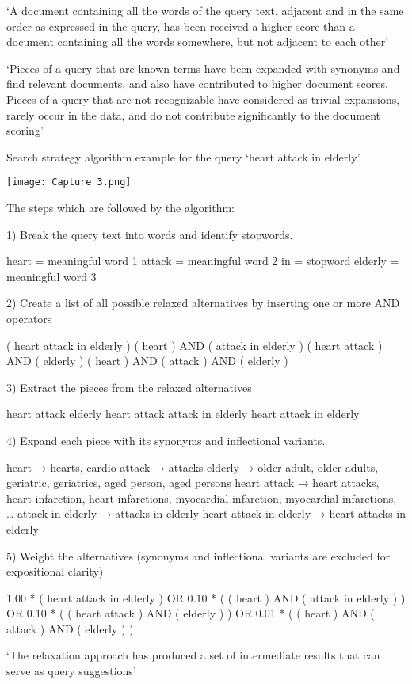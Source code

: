 \documentclass[]{article}
\begin{document}
{{‘A document containing all the words of the query text, adjacent and in the same order as expressed in the query, has been received a higher score than a document containing all the words somewhere, but not adjacent to each other’

‘Pieces of a query that are known terms have been expanded with synonyms and find relevant documents, and also have contributed to higher document scores. Pieces of a query that are not recognizable have considered as trivial expansions, rarely occur in the data, and do not contribute significantly to the document scoring’

Search strategy algorithm example for the query ‘heart attack in elderly’

\texttt{[image: Capture 3.png]}

The steps which are followed by the algorithm:

1)	Break the query text into words and identify stopwords.

heart = meaningful word 1 
attack = meaningful word 2
in = stopword
elderly = meaningful word 3

2)	Create a list of all possible relaxed alternatives by inserting one or more AND operators

( heart attack in elderly )
( heart ) AND ( attack in elderly )
( heart attack ) AND ( elderly )
( heart ) AND ( attack ) AND ( elderly )

3)	Extract the pieces from the relaxed alternatives

heart
attack
elderly
heart attack
attack in elderly
heart attack in elderly

4)	Expand each piece with its synonyms and inflectional variants.

heart → hearts, cardio
attack → attacks
elderly → older adult, older adults, geriatric, geriatrics,
aged person, aged persons
heart attack → heart attacks, heart infarction,
heart infarctions, myocardial infarction,
myocardial infarctions, …
attack in elderly → attacks in elderly
heart attack in elderly → heart attacks in elderly

5)	Weight the alternatives (synonyms and inflectional variants are excluded for expositional clarity)

1.00 * ( heart attack in elderly ) OR
0.10 * ( ( heart ) AND ( attack in elderly ) ) OR
0.10 * ( ( heart attack ) AND ( elderly ) ) OR
0.01 * ( ( heart ) AND ( attack ) AND ( elderly ) )

‘The relaxation approach has produced a set of intermediate results that can serve as query suggestions’

}}
\end{document}
